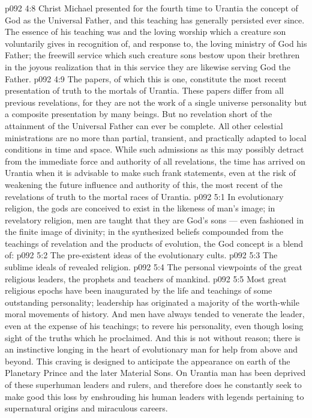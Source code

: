 \vs p092 4:8 \bibnobreakspace {} Christ Michael presented for the fourth time to Urantia the concept of God as the Universal Father, and this teaching has generally persisted ever since. The essence of his teaching was  and  the loving worship which a creature son voluntarily gives in recognition of, and response to, the loving ministry of God his Father; the freewill service which such creature sons bestow upon their brethren in the joyous realization that in this service they are likewise serving God the Father.
\vs p092 4:9 \bibnobreakspace {} The papers, of which this is one, constitute the most recent presentation of truth to the mortals of Urantia. These papers differ from all previous revelations, for they are not the work of a single universe personality but a composite presentation by many beings. But no revelation short of the attainment of the Universal Father can ever be complete. All other celestial ministrations are no more than partial, transient, and practically adapted to local conditions in time and space. While such admissions as this may possibly detract from the immediate force and authority of all revelations, the time has arrived on Urantia when it is advisable to make such frank statements, even at the risk of weakening the future influence and authority of this, the most recent of the revelations of truth to the mortal races of Urantia.
\vs p092 5:1 In evolutionary religion, the gods are conceived to exist in the likeness of man’s image; in revelatory religion, men are taught that they are God’s sons --- even fashioned in the finite image of divinity; in the synthesized beliefs compounded from the teachings of revelation and the products of evolution, the God concept is a blend of:
\vs p092 5:2 \bibnobreakspace The pre\hyp{}existent ideas of the evolutionary cults.
\vs p092 5:3 \bibnobreakspace The sublime ideals of revealed religion.
\vs p092 5:4 \bibnobreakspace The personal viewpoints of the great religious leaders, the prophets and teachers of mankind.
\vs p092 5:5 \pc Most great religious epochs have been inaugurated by the life and teachings of some outstanding personality; leadership has originated a majority of the worth\hyp{}while moral movements of history. And men have always tended to venerate the leader, even at the expense of his teachings; to revere his personality, even though losing sight of the truths which he proclaimed. And this is not without reason; there is an instinctive longing in the heart of evolutionary man for help from above and beyond. This craving is designed to anticipate the appearance on earth of the Planetary Prince and the later Material Sons. On Urantia man has been deprived of these superhuman leaders and rulers, and therefore does he constantly seek to make good this loss by enshrouding his human leaders with legends pertaining to supernatural origins and miraculous careers.

